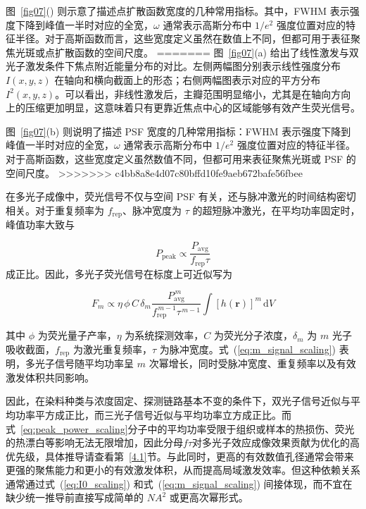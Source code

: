 图~\ref{fig07}() 则示意了描述点扩散函数宽度的几种常用指标。其中，FWHM 表示强度下降到峰值一半时对应的全宽，$\omega$ 通常表示高斯分布中 $1/e^2$ 强度位置对应的特征半径。对于高斯函数而言，这些宽度定义虽然在数值上不同，但都可用于表征聚焦光斑或点扩散函数的空间尺度。
=======
图~\ref{fig07}(a)\cite{RN1177} 给出了线性激发与双光子激发条件下焦点附近能量分布的对比。左侧两幅图分别表示线性强度分布 $I(x,y,z)$ 在轴向和横向截面上的形态；右侧两幅图表示对应的平方分布 $I^2(x,y,z)$。可以看出，非线性激发后，主瓣范围明显缩小，尤其是在轴向方向上的压缩更加明显，这意味着只有更靠近焦点中心的区域能够有效产生荧光信号。

图~\ref{fig07}(b) 则说明了描述 PSF 宽度的几种常用指标：FWHM 表示强度下降到峰值一半时对应的全宽，$\omega$ 通常表示高斯分布中 $1/e^2$ 强度位置对应的特征半径。对于高斯函数，这些宽度定义虽然数值不同，但都可用来表征聚焦光斑或 PSF 的空间尺度。
>>>>>>> c4bb8a8e4d07c80bffd10fe9aeb672bafe56fbee

在多光子成像中，荧光信号不仅与空间 PSF 有关，还与脉冲激光的时间结构密切相关。对于重复频率为 $f_{\mathrm{rep}}$、脉冲宽度为 $\tau$ 的超短脉冲激光，在平均功率固定时，峰值功率大致与

\begin{equation}
  P_{\mathrm{peak}}\propto \frac{P_{\mathrm{avg}}}{f_{\mathrm{rep}}\tau}
  \label{eq:peak_power_scaling}
\end{equation}
成正比。因此，多光子荧光信号在标度上可近似写为

\begin{equation}
  F_m \propto \eta\,\phi\,C\,\delta_m
  \frac{P_{\mathrm{avg}}^{\,m}}{f_{\mathrm{rep}}^{\,m-1}\tau^{\,m-1}}
  \int [h(\mathbf{r})]^m\,\mathrm{d}V
  \label{eq:m_signal_scaling}
\end{equation}

其中 $\phi$ 为荧光量子产率，$\eta$ 为系统探测效率，$C$ 为荧光分子浓度，$\delta_m$ 为 $m$ 光子吸收截面，$f_{\mathrm{rep}}$ 为激光重复频率，$\tau$ 为脉冲宽度。式~(\ref{eq:m_signal_scaling}) 表明，多光子信号随平均功率呈 $m$ 次幂增长，同时受脉冲宽度、重复频率以及有效激发体积共同影响。

因此，在染料种类与浓度固定、探测链路基本不变的条件下，双光子信号近似与平均功率平方成正比，而三光子信号近似与平均功率立方成正比。而式~\ref{eq:peak_power_scaling}分子中的平均功率受限于组织或样本的热损伤、荧光的热漂白等影响无法无限增加，因此分母$f\tau$对多光子效应成像效果贡献为优化的高优先级，具体推导请查看第~\ref{4.1}节。与此同时，更高的有效数值孔径通常会带来更强的聚焦能力和更小的有效激发体积，从而提高局域激发效率。但这种依赖关系通常通过式~(\ref{eq:I0_scaling}) 和式~(\ref{eq:m_signal_scaling}) 间接体现，而不宜在缺少统一推导前直接写成简单的 $NA^2$ 或更高次幂形式。

